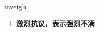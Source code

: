 
\begin{frame}
{\huge inveigh}
\begin{center}
\begin{enumerate}\Large
  \item \textbf{激烈抗议，表示强烈不满}
\end{enumerate}
\end{center}
\end{frame}
